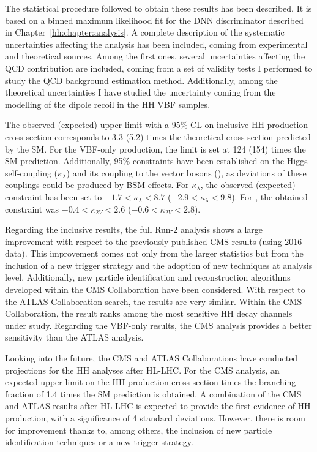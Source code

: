 \documentclass[../main.tex]{subfiles}
\begin{document}
The statistical procedure followed to obtain these results has been described. It is based on a binned maximum likelihood fit for the DNN discriminator described in Chapter~\ref{hh:chapter:analysis}. A complete description of the systematic uncertainties affecting the analysis has been included, coming from experimental and theoretical sources. Among the first ones, several uncertainties affecting the QCD contribution are included, coming from a set of validity tests I performed to study the QCD background estimation method. Additionally, among the theoretical uncertainties I have studied the uncertainty coming from the modelling of the dipole recoil in the HH VBF samples.

The observed (expected) upper limit with a 95\% CL on inclusive HH production cross section corresponds to 3.3 (5.2) times the theoretical cross section predicted by the SM. For the VBF-only production, the limit is set at 124 (154) times the SM prediction. Additionally, 95\% constraints have been established on the Higgs self-coupling ($\kappa_\lambda$) and its coupling to the vector bosons (\kvv), as deviations of these couplings could be produced by BSM effects. For $\kappa_\lambda$, the observed (expected) constraint has been set to $-1.7 < \kappa_\lambda < 8.7$ ($-2.9 < \kappa_\lambda < 9.8$). For \kvv{}, the obtained constraint was $-0.4 < \kappa_{2V} < 2.6$ ($-0.6 < \kappa_{2V} < 2.8$).

Regarding the inclusive results, the full Run-2 analysis shows a large improvement with respect to the previously published CMS \hhbbtt{} results (using 2016 data). This improvement comes not only from the larger statistics but from the inclusion of a new trigger strategy and the adoption of new techniques at analysis level. Additionally, new particle identification and reconstruction algorithms developed within the CMS Collaboration have been considered. With respect to the ATLAS Collaboration \hhbbtt{} search, the results are very similar. Within the CMS Collaboration, the \hhbbtt{} result ranks among the most sensitive HH decay channels under study. Regarding the VBF-only results, the CMS \hhbbtt{} analysis provides a better sensitivity than the ATLAS analysis.

Looking into the future, the CMS and ATLAS Collaborations have conducted projections for the HH analyses after HL-LHC. For the CMS \hhbbtt{} analysis, an expected upper limit on the HH production cross section times the branching fraction of 1.4 times the SM prediction is obtained. A combination of the CMS and ATLAS results after HL-LHC is expected to provide the first evidence of HH production, with a significance of 4 standard deviations. However, there is room for improvement thanks to, among others, the inclusion of new particle identification techniques or a new trigger strategy.
\end{document}
